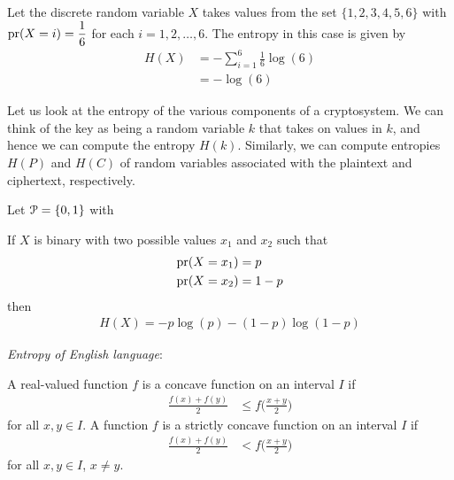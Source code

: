 \documentclass[a4paper, 12pt]{book} %
\begin{document}
\begin{example}
    Let the discrete random variable $X$ takes values from the set $\{1,2,3,4,5,6\}$ with $\operatorname{pr}(X = i) = \dfrac{1}{6}$ for each $i = 1, 2, \ldots, 6$. The entropy in this case is given by 
    \begin{align}
        H(X) &= -\sum_{i=1}^6 \frac{1}{6}\log(6) \\
            &= -\log(6)
    \end{align}
\end{example}

Let us look at the entropy of the various components of a cryptosystem. We
can think of the key as being a random variable $k$ that takes on values in $k$, and hence we can compute the entropy $H(k)$. Similarly, we can compute entropies $H(P)$ and $H(C)$ of random variables associated with the plaintext and ciphertext, respectively. 

\begin{example}
    Let $\EuScript{P} = \{0,1\}$ with 

\end{example}



\begin{example}
    If $X$ is binary with two possible values $x_1$ and $x_2$ such that
    \begin{align}
        \operatorname{pr}(X = x_1) &= p \\
        \operatorname{pr}(X = x_2) &= 1-p
    \end{align}
    then 
    \begin{align}
        H(X) = - p \log(p) - (1-p)\log(1-p)
    \end{align}
\end{example}


\begin{example}
    \emph{Entropy of English language}:
\end{example}


\begin{definition}
    A real-valued function $f$ is a concave function on an interval $I$ if
    \begin{align}
        \frac{f(x) + f(y)}{2} &\leq f \bigg( \frac{x+y}{2} \bigg)
    \end{align}
    for all $x, y \in I$. A function $f$ is a strictly concave function on an interval $I$ if
    \begin{align}
        \frac{f(x) + f(y)}{2} &< f \bigg( \frac{x+y}{2} \bigg)
    \end{align}
    for all $x, y \in I$, $x \neq y$.
\end{definition}
\end{document}
